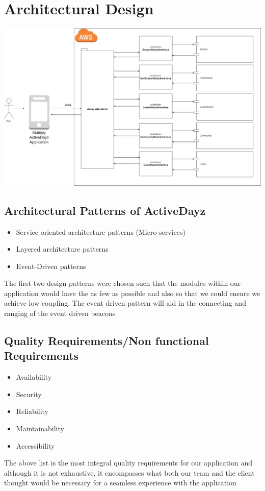 \documentclass[11pt]{article}
\begin{document}
\section{Architectural Design}
\includegraphics[width=0.7\linewidth]{Integration.jpg}\\[1cm]
\subsection{Architectural Patterns of ActiveDayz}
\begin{itemize}
\item Service oriented architecture patterns (Micro services)
\item Layered architecture patterns
\item Event-Driven patterns 
\end{itemize}
The first two design patterns were chosen such that the modules within our application would have the as few as possible and also so that we could ensure we achieve low coupling. The event driven pattern will aid in the connecting and ranging of the event driven beacons 

\subsection{Quality Requirements/Non functional Requirements}
\begin{itemize}
\item Availability
\item Security
\item Reliability
\item Maintainability
\item Accessibility 
\end{itemize}
The above list is the most integral quality requirements for our application and although it is not exhaustive, it encompasses what both our team and the client thought would be necessary for a seamless experience with the application 
\end{document}
